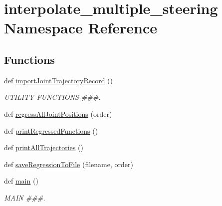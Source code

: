 \hypertarget{namespaceinterpolate__multiple__steering}{}\section{interpolate\+\_\+multiple\+\_\+steering Namespace Reference}
\label{namespaceinterpolate__multiple__steering}
\subsection*{Functions}
\begin{DoxyCompactItemize}
\item 
def \mbox{\hyperlink{namespaceinterpolate__multiple__steering_a5bb09c62b940ad1f33bf0311403f7891}{import\+Joint\+Trajectory\+Record}} ()
\begin{DoxyCompactList}\small\item\em U\+T\+I\+L\+I\+TY F\+U\+N\+C\+T\+I\+O\+NS \#\#\#. \end{DoxyCompactList}\item 
def \mbox{\hyperlink{namespaceinterpolate__multiple__steering_af2f020c741f76783ea8120460b32faad}{regress\+All\+Joint\+Positions}} (order)
\item 
def \mbox{\hyperlink{namespaceinterpolate__multiple__steering_a6ea24bdc56b6477a5f509f51d3a1ab77}{print\+Regressed\+Functions}} ()
\item 
def \mbox{\hyperlink{namespaceinterpolate__multiple__steering_aa88c1326cd210f1fb9712db074a48026}{print\+All\+Trajectories}} ()
\item 
def \mbox{\hyperlink{namespaceinterpolate__multiple__steering_a95c87f32664608d02c9c789f8f27057b}{save\+Regression\+To\+File}} (filename, order)
\item 
def \mbox{\hyperlink{namespaceinterpolate__multiple__steering_accebfe59c810e1fb08021e1ec21f00f4}{main}} ()
\begin{DoxyCompactList}\small\item\em M\+A\+IN \#\#\#. \end{DoxyCompactList}\end{DoxyCompactItemize}
